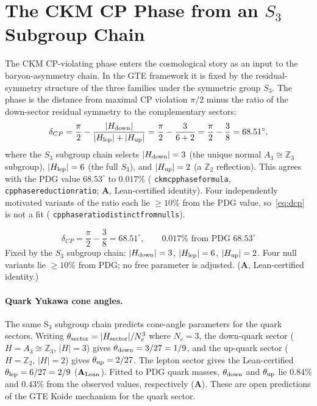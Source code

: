 \documentclass[11pt]{article}
\theoremstyle{remark}
\newcommand{\ZZ}{\mathbb{Z}}
\newcommand{\lean}[1]{%
  \penalty-100
  \begingroup\def\_{\textunderscore\allowbreak}\texttt{#1}\endgroup}
\newcommand{\CatA}{\textbf{A}}
\newcommand{\CatAL}{\ensuremath{\textbf{A}_{\rm Lean}}}
\begin{document}
\section{The CKM CP Phase from an $S_3$ Subgroup Chain}
\label{sec:ckm}

The CKM CP-violating phase enters the cosmological story as an input to the
baryon-asymmetry chain. In the GTE framework it is fixed by the residual-symmetry
structure of the three families under the symmetric group $S_3$. The phase is the
distance from maximal CP violation $\pi/2$ minus the ratio of the down-sector
residual symmetry to the complementary sectors:
\begin{equation}
  \delta_{CP} = \frac{\pi}{2} - \frac{|H_{\rm down}|}{|H_{\rm lep}| + |H_{\rm up}|}
  = \frac{\pi}{2} - \frac{3}{6 + 2}
  = \frac{\pi}{2} - \frac{3}{8}
  = 68.51^\circ,
  \label{eq:dcp}
\end{equation}
where the $S_3$ subgroup chain selects $|H_{\rm down}| = 3$ (the unique normal
$A_3 \cong \ZZ_3$ subgroup), $|H_{\rm lep}| = 6$ (the full $S_3$), and
$|H_{\rm up}| = 2$ (a $\ZZ_2$ reflection). This agrees with the PDG value
$68.53^\circ$ to $0.017\%$ (\lean{ckm\_cp\_phase\_formula},
\lean{cp\_phase\_reduction\_ratio}; \CatA, Lean-certified identity). Four
independently motivated variants of the ratio each lie $\ge 10\%$ from the PDG
value, so~\eqref{eq:dcp} is not a fit (\lean{cp\_phase\_ratio\_distinct\_from\_nulls}).

\begin{tcolorbox}[colback=gray!7,colframe=gray!55!black,
  title={\textbf{Key Result: CKM CP Phase}},
  fonttitle=\bfseries,left=6pt,right=6pt,top=5pt,bottom=5pt]
\small
\[
  \delta_{CP} = \frac{\pi}{2} - \frac{3}{8} = 68.51^\circ,\qquad
  0.017\%\text{ from PDG~}68.53^\circ
\]
Fixed by the $S_3$ subgroup chain: $|H_{\rm down}|=3$, $|H_{\rm lep}|=6$,
$|H_{\rm up}|=2$.  Four null variants lie ${\ge}10\%$ from PDG; no free
parameter is adjusted.  (\CatA, Lean-certified identity.)
\end{tcolorbox}

\paragraph{Quark Yukawa cone angles.}
The same S$_3$ subgroup chain predicts cone-angle parameters for the quark sectors.
Writing $\theta_{\rm sector} = |H_{\rm sector}|/N_c^3$ where $N_c = 3$, the
down-quark sector ($H = A_3 \cong \ZZ_3$, $|H|=3$) gives $\theta_{\rm down} =
3/27 = 1/9$, and the up-quark sector ($H = \ZZ_2$, $|H|=2$) gives $\theta_{\rm
up} = 2/27$. The lepton sector gives the Lean-certified $\theta_{\rm lep} = 6/27 =
2/9$ (\CatAL). Fitted to PDG quark masses, $\theta_{\rm down}$ and $\theta_{\rm up}$
lie $0.84\%$ and $0.43\%$ from the observed values, respectively (\CatA). These are
open predictions of the GTE Koide mechanism for the quark sector.
\end{document}
